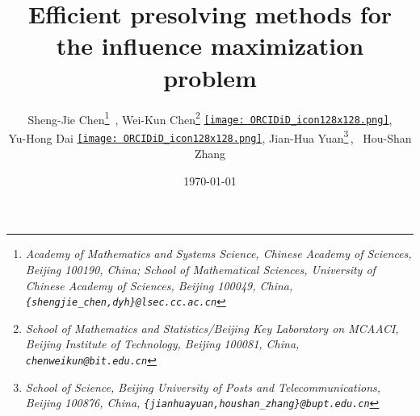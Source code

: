 \documentclass[a4paper,10pt]{article}
\def\guidelines{0}
\def\longtitle{Efficient presolving methods for the influence maximization problem}
\theoremstyle{plain}
\begin{document}
	
	
	\title{\longtitle}
	
	\author{
		Sheng-Jie Chen\thanks{\itshape Academy of Mathematics and Systems Science, Chinese Academy of Sciences, Beijing 100190, China; School of Mathematical Sciences, University of Chinese Academy of Sciences, Beijing 100049, China, \nolinkurl{{shengjie_chen,dyh}@lsec.cc.ac.cn}\vspace*{0.5ex}}~,\hspace{3pt}
		Wei-Kun Chen\thanks{\itshape School of Mathematics and Statistics/Beijing Key Laboratory on MCAACI, Beijing Institute of Technology, Beijing 100081, China, \nolinkurl{chenweikun@bit.edu.cn}\vspace*{0.5ex}}
		\href{https://orcid.org/0000-0003-4147-1346}{\hspace{3pt}\texttt{[image: ORCIDiD\_icon128x128.png]}\hspace{3pt}},\\
		Yu-Hong Dai	\href{https://orcid.org/0000-0002-6932-9512}{\hspace{3pt}\texttt{[image: ORCIDiD\_icon128x128.png]}},
		Jian-Hua Yuan\thanks{\itshape School of Science, Beijing University of Posts and Telecommunications, Beijing 100876, China, \nolinkurl{{jianhuayuan,houshan_zhang}@bupt.edu.cn}}\,,~
		Hou-Shan Zhang
	}
	
	\date{\today}
	
	

	
	
	\maketitle
	
\end{document}
